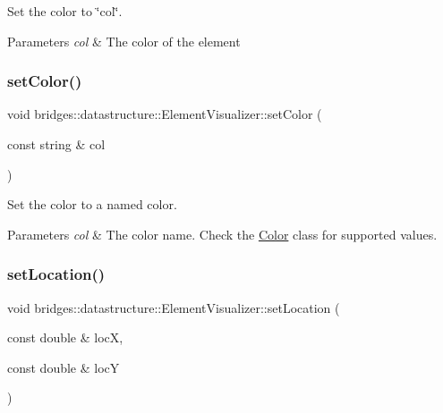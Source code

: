 Set the color to \char`\"{}col\char`\"{}. 


\begin{DoxyParams}{Parameters}
{\em col} & The color of the element \\
\hline
\end{DoxyParams}
\mbox{\label{classbridges_1_1datastructure_1_1_element_visualizer_a0068ebe250375b13c5b3d4af0df20dea}} 
\subsubsection{\texorpdfstring{setColor()}{setColor()}\hspace{0.1cm}{\footnotesize\ttfamily [2/2]}}
{\footnotesize\ttfamily void bridges\+::datastructure\+::\+Element\+Visualizer\+::set\+Color (\begin{DoxyParamCaption}\item[{const string \&}]{col }\end{DoxyParamCaption})\hspace{0.3cm}{\ttfamily [inline]}}



Set the color to a named color. 


\begin{DoxyParams}{Parameters}
{\em col} & The color name. Check the \mbox{\hyperlink{classbridges_1_1datastructure_1_1_color}{Color}} class for supported values. \\
\hline
\end{DoxyParams}
\mbox{\label{classbridges_1_1datastructure_1_1_element_visualizer_ae980cb185ddb11ecd1cebeb4834734bf}} 
\subsubsection{\texorpdfstring{setLocation()}{setLocation()}}
{\footnotesize\ttfamily void bridges\+::datastructure\+::\+Element\+Visualizer\+::set\+Location (\begin{DoxyParamCaption}\item[{const double \&}]{locX,  }\item[{const double \&}]{locY }\end{DoxyParamCaption})\hspace{0.3cm}{\ttfamily [inline]}}

